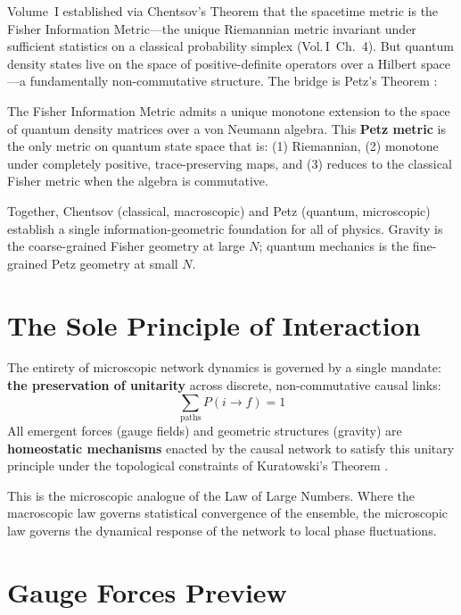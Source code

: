 \documentclass[11pt, a4paper, openany]{book}
\newcommand{\VolI}[1]{\textnormal{(Vol.\,I~#1)}}
\newcounter{thm}[chapter]
\begin{document}
Volume~I established via Chentsov's Theorem that the spacetime metric is the Fisher Information Metric---the unique Riemannian metric invariant under sufficient statistics on a classical probability simplex \VolI{Ch.~4}. But quantum density states live on the space of positive-definite operators over a Hilbert space---a fundamentally non-commutative structure. The bridge is Petz's Theorem \cite{petz1996}:

\begin{theorem}\label{thm:petz}
The Fisher Information Metric admits a unique monotone extension to the space of quantum density matrices over a von Neumann algebra. This \textbf{Petz metric} is the only metric on quantum state space that is: (1) Riemannian, (2) monotone under completely positive, trace-preserving maps, and (3) reduces to the classical Fisher metric when the algebra is commutative.
\end{theorem}

\noindent
Together, Chentsov \cite{chentsov1982} (classical, macroscopic) and Petz (quantum, microscopic) establish a single information-geometric foundation for all of physics. Gravity is the coarse-grained Fisher geometry at large $N$; quantum mechanics is the fine-grained Petz geometry at small $N$.

\section*{The Sole Principle of Interaction}

\begin{axiom}\label{ax:unitarity}
The entirety of microscopic network dynamics is governed by a single mandate: \textbf{the preservation of unitarity} across discrete, non-commutative causal links:
\[
  \sum_{\text{paths}} P(i \to f) = 1
\]
All emergent forces (gauge fields) and geometric structures (gravity) are \textbf{homeostatic mechanisms} enacted by the causal network to satisfy this unitary principle under the topological constraints of Kuratowski's Theorem \cite{kuratowski1930}.
\end{axiom}

\noindent
This is the microscopic analogue of the Law of Large Numbers. Where the macroscopic law governs statistical convergence of the ensemble, the microscopic law governs the dynamical response of the network to local phase fluctuations.

\section*{Gauge Forces Preview}
\end{document}
